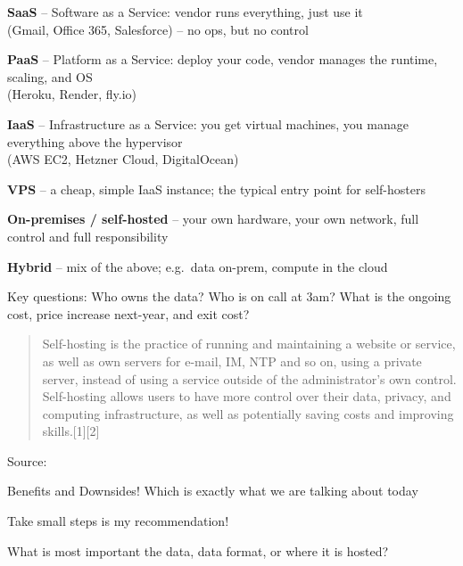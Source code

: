 \documentclass[Screen16to9,17pt]{foils}
\begin{document}
\begin{list2}
\item {\bf SaaS} -- Software as a Service: vendor runs everything, just use it\\
(Gmail, Office 365, Salesforce) -- no ops, but no control
\item {\bf PaaS} -- Platform as a Service: deploy your code, vendor manages
the runtime, scaling, and OS\\ (Heroku, Render, fly.io)
\item {\bf IaaS} -- Infrastructure as a Service: you get virtual machines, you manage
everything above the hypervisor\\ (AWS EC2, Hetzner Cloud, DigitalOcean)
\item {\bf VPS} -- a cheap, simple IaaS instance; the typical entry point for self-hosters
\item {\bf On-premises / self-hosted} -- your own hardware, your own network,
full control and full responsibility
\item {\bf Hybrid} -- mix of the above; e.g.\ data on-prem, compute in the cloud
\item Key questions: Who owns the data? Who is on call at 3am? What is the ongoing cost, price increase next-year, and exit cost?
\end{list2}



\begin{quote}
Self-hosting is the practice of running and maintaining a website or service, as well as own servers for e-mail, IM, NTP and so on, using a private server, instead of using a service outside of the administrator's own control. Self-hosting allows users to have more control over their data, privacy, and computing infrastructure, as well as potentially saving costs and improving skills.[1][2]
\end{quote}
Source: 

\begin{list2}
\item Benefits and Downsides! Which is exactly what we are talking about today
\item Take small steps is my recommendation!
\item What is most important the data, data format, or where it is hosted?
\end{list2}


\end{document}
